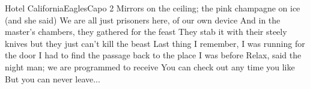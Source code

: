 \begin{song}{Hotel California}{Eagles}{Capo 2}
Mirrors on the ceiling; the pink champagne on ice (and she said)
We are all just prisoners here, of our own device
And in the master's chambers, they gathered for the feast
They stab it with their steely knives but they
just can't kill the beast
Last thing I remember, I was running for the door
I had to find the passage back to the place I was before
Relax, said the night man; we are programmed to receive
You can check out any time you like
But you can never leave...

 
\end{song}
